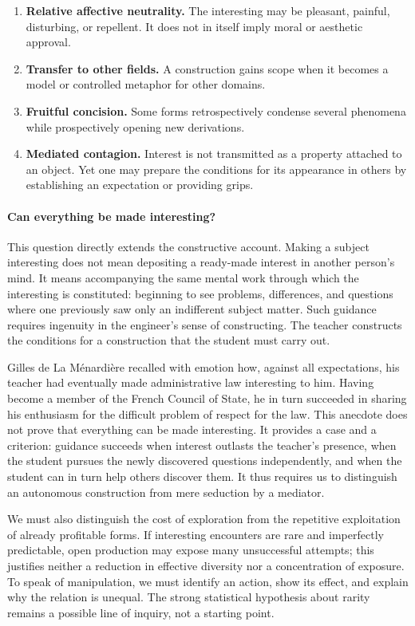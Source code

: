 \documentclass[11pt,a4paper]{article}
\begin{document}
\begin{enumerate}[resume]
  \item \textbf{Relative affective neutrality.} The interesting may be
        pleasant, painful, disturbing, or repellent. It does not in itself
        imply moral or aesthetic approval.
  \item \textbf{Transfer to other fields.} A construction gains scope when it
        becomes a model or controlled metaphor for other domains.
  \item \textbf{Fruitful concision.} Some forms retrospectively condense
        several phenomena while prospectively opening new derivations.
  \item \textbf{Mediated contagion.} Interest is not transmitted as a property
        attached to an object. Yet one may prepare the conditions for its
        appearance in others by establishing an expectation or providing
        grips.
\end{enumerate}

\paragraph{Can everything be made interesting?}

This question directly extends the constructive account. Making a subject
interesting does not mean depositing a ready-made interest in another person's
mind. It means accompanying the same mental work through which the interesting
is constituted: beginning to see problems, differences, and questions where
one previously saw only an indifferent subject matter. Such guidance requires
ingenuity in the engineer's sense of constructing. The teacher constructs the
conditions for a construction that the student must carry out.

Gilles de La Ménardière recalled with emotion how, against all expectations,
his teacher had eventually made administrative law interesting to him. Having
become a member of the French Council of State, he in turn succeeded in sharing
his enthusiasm for the difficult problem of respect for the law. This anecdote
does not prove that everything can be made interesting. It provides a case and
a criterion: guidance succeeds when interest outlasts the teacher's presence,
when the student pursues the newly discovered questions independently, and when
the student can in turn help others discover them. It thus requires us to
distinguish an autonomous construction from mere seduction by a mediator.

We must also distinguish the cost of exploration from the repetitive
exploitation of already profitable forms. If interesting encounters
are rare and imperfectly predictable, open production may expose many
unsuccessful attempts; this justifies neither a reduction in effective diversity
nor a concentration of exposure. To speak of manipulation, we must identify an
action, show its effect, and explain why the relation is unequal. The strong
statistical hypothesis about rarity remains a possible line of inquiry, not a
starting point.
\end{document}
